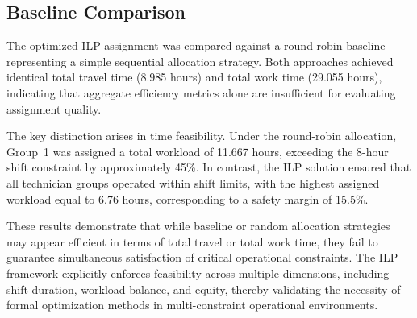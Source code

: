 \documentclass[11pt]{article}
\begin{document}
\subsection*{Baseline Comparison}

The optimized ILP assignment was compared against a round-robin baseline representing a simple sequential allocation strategy. Both approaches achieved identical total travel time (8.985 hours) and total work time (29.055 hours), indicating that aggregate efficiency metrics alone are insufficient for evaluating assignment quality.

The key distinction arises in time feasibility. Under the round-robin allocation, Group~1 was assigned a total workload of 11.667 hours, exceeding the 8-hour shift constraint by approximately 45\%. In contrast, the ILP solution ensured that all technician groups operated within shift limits, with the highest assigned workload equal to 6.76 hours, corresponding to a safety margin of 15.5\%.

These results demonstrate that while baseline or random allocation strategies may appear efficient in terms of total travel or total work time, they fail to guarantee simultaneous satisfaction of critical operational constraints. The ILP framework explicitly enforces feasibility across multiple dimensions, including shift duration, workload balance, and equity, thereby validating the necessity of formal optimization methods in multi-constraint operational environments.




\end{document}
